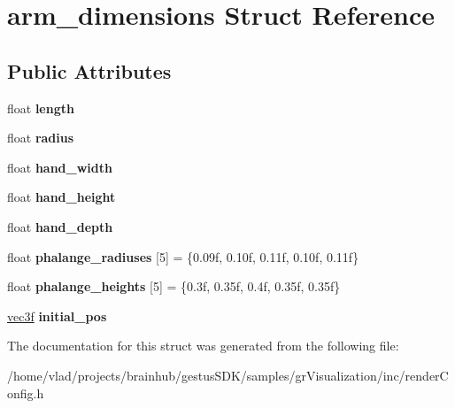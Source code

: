 \hypertarget{structarm__dimensions}{}\section{arm\+\_\+dimensions Struct Reference}
\label{structarm__dimensions}
\subsection*{Public Attributes}
\begin{DoxyCompactItemize}
\item 
\mbox{\label{structarm__dimensions_acd176764a5ea8e40b9e0f40a1bd359d5}} 
float {\bfseries length}
\item 
\mbox{\label{structarm__dimensions_abfdf5d4ed97c4ff1ec08ed39f3f5895a}} 
float {\bfseries radius}
\item 
\mbox{\label{structarm__dimensions_a1d8d132f476492436751494041864573}} 
float {\bfseries hand\+\_\+width}
\item 
\mbox{\label{structarm__dimensions_a865578efd9972a0bfcc11dc7b87afc8f}} 
float {\bfseries hand\+\_\+height}
\item 
\mbox{\label{structarm__dimensions_a8a06184eb220382e2d60297ebb798afa}} 
float {\bfseries hand\+\_\+depth}
\item 
\mbox{\label{structarm__dimensions_ab7257a355705865c5261a926918524f0}} 
float {\bfseries phalange\+\_\+radiuses} \mbox{[}5\mbox{]} = \{0.\+09f, 0.\+10f, 0.\+11f, 0.\+10f, 0.\+11f\}
\item 
\mbox{\label{structarm__dimensions_ab6a71ae8acf35fb9f8d616e005b3b005}} 
float {\bfseries phalange\+\_\+heights} \mbox{[}5\mbox{]} = \{0.\+3f, 0.\+35f, 0.\+4f, 0.\+35f, 0.\+35f\}
\item 
\mbox{\label{structarm__dimensions_a3746ccaeb40ca9a1aebc952472d95a71}} 
\mbox{\hyperlink{structvec3f}{vec3f}} {\bfseries initial\+\_\+pos}
\end{DoxyCompactItemize}


The documentation for this struct was generated from the following file\+:\begin{DoxyCompactItemize}
\item 
/home/vlad/projects/brainhub/gestus\+S\+D\+K/samples/gr\+Visualization/inc/render\+Config.\+h\end{DoxyCompactItemize}
